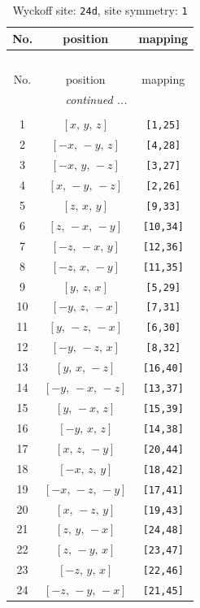 \documentclass[fleqn,8pt]{jsarticle}
\begin{document}
\begin{longtable}{ccc}
\caption{Wyckoff site: {\tt 24d}, site symmetry: {\tt 1}}
 \\
 \hline \hline
No. & position & mapping \\ \hline \endfirsthead

\multicolumn{2}{l}{\tablename\ \thetable{}} \\
 \hline \hline
No. & position & mapping \\ \hline \endhead

 \hline \hline
\multicolumn{2}{r}{\footnotesize\it continued ...} \\ \endfoot

 \hline \hline
\multicolumn{2}{r}{} \\ \endlastfoot

1 & $\left[ x,\, y,\, z \right]$ & {\tt [1,25]} \\ \hline
2 & $\left[ - x,\, - y,\, z \right]$ & {\tt [4,28]} \\ \hline
3 & $\left[ - x,\, y,\, - z \right]$ & {\tt [3,27]} \\ \hline
4 & $\left[ x,\, - y,\, - z \right]$ & {\tt [2,26]} \\ \hline
5 & $\left[ z,\, x,\, y \right]$ & {\tt [9,33]} \\ \hline
6 & $\left[ z,\, - x,\, - y \right]$ & {\tt [10,34]} \\ \hline
7 & $\left[ - z,\, - x,\, y \right]$ & {\tt [12,36]} \\ \hline
8 & $\left[ - z,\, x,\, - y \right]$ & {\tt [11,35]} \\ \hline
9 & $\left[ y,\, z,\, x \right]$ & {\tt [5,29]} \\ \hline
10 & $\left[ - y,\, z,\, - x \right]$ & {\tt [7,31]} \\ \hline
11 & $\left[ y,\, - z,\, - x \right]$ & {\tt [6,30]} \\ \hline
12 & $\left[ - y,\, - z,\, x \right]$ & {\tt [8,32]} \\ \hline
13 & $\left[ y,\, x,\, - z \right]$ & {\tt [16,40]} \\ \hline
14 & $\left[ - y,\, - x,\, - z \right]$ & {\tt [13,37]} \\ \hline
15 & $\left[ y,\, - x,\, z \right]$ & {\tt [15,39]} \\ \hline
16 & $\left[ - y,\, x,\, z \right]$ & {\tt [14,38]} \\ \hline
17 & $\left[ x,\, z,\, - y \right]$ & {\tt [20,44]} \\ \hline
18 & $\left[ - x,\, z,\, y \right]$ & {\tt [18,42]} \\ \hline
19 & $\left[ - x,\, - z,\, - y \right]$ & {\tt [17,41]} \\ \hline
20 & $\left[ x,\, - z,\, y \right]$ & {\tt [19,43]} \\ \hline
21 & $\left[ z,\, y,\, - x \right]$ & {\tt [24,48]} \\ \hline
22 & $\left[ z,\, - y,\, x \right]$ & {\tt [23,47]} \\ \hline
23 & $\left[ - z,\, y,\, x \right]$ & {\tt [22,46]} \\ \hline
24 & $\left[ - z,\, - y,\, - x \right]$ & {\tt [21,45]} \\
\end{longtable}
\end{document}
